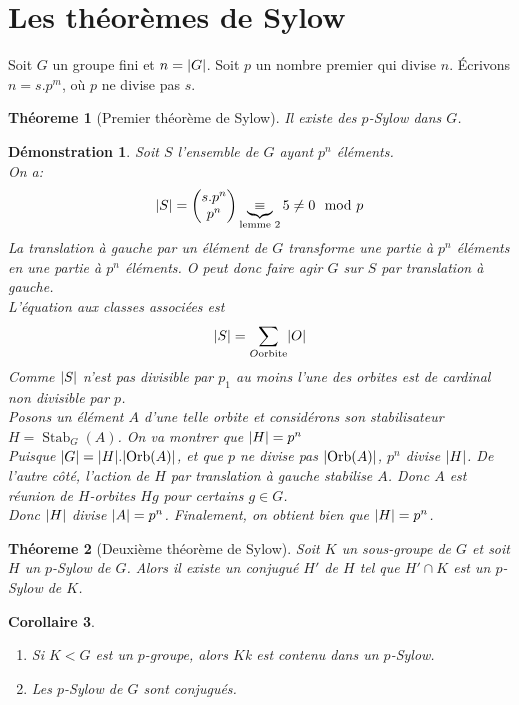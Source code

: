 \documentclass[a4paper, oneside]{report}
\theoremstyle{break}
\newtheorem{thm}{Théoreme}[section] %
\newtheorem{corollaire}[thm]{Corollaire}
\newtheorem*{demonstration}{Démonstration}
\DeclarePairedDelimiter\abs{\lvert}{\rvert}%
\DeclareMathOperator{\Stab}{Stab}
\DeclareMathOperator{\Orb}{Orb}
\newcommand{\ub}{\underbrace}
\begin{document}
\section{Les théorèmes de Sylow}

Soit $G$ un groupe fini et $n = \abs{G}$. Soit $p$ un nombre premier qui divise $n$. Écrivons $n = s.p^m$, où $p$ ne divise pas $s$.

\begin{thm}[Premier théorème de Sylow]
Il existe des $p$-Sylow dans $G$.
\end{thm}

\begin{demonstration}
Soit $S$ l'ensemble de $G$ ayant $p^n$ éléments.\\
On a:
\[
\abs{S} = 
\begin{pmatrix}
s.p^n		\\	p^n
\end{pmatrix} 
\ub{\equiv}_{\text{lemme 2}} 5 \neq 0 \mod p
\]
La translation à gauche par un élément de $G$ transforme une partie à $p^n$ éléments en une partie à $p^n$ éléments. O peut donc faire agir $G$ sur $S$ par translation à gauche.\\
L'équation aux classes associées est
\[
\abs{S} = \sum_{O \text{orbite}} \abs{O}
\]
Comme $\abs{S}$ n'est pas divisible par $p_1$ au moins l'une des orbites est de cardinal non divisible par $p$.\\
Posons un élément $A$ d'une telle orbite et considérons son stabilisateur $H = \Stab_G(A)$. On va montrer que $\abs{H} = p^n$\\
Puisque $\abs{G} = \abs{H} . \abs{\Orb(A)}$, et que $p$ ne divise pas $\abs{\Orb(A)}$, $p^n$ divise $\abs{H}$. De l'autre côté, l'action de $H$ par translation à gauche stabilise $A$. Donc $A$ est réunion de $H$-orbites $Hg$ pour certains $g \in G$.\\
Donc $\abs{H}$ divise $\abs{A} = p^n$. Finalement, on obtient bien que $\abs{H} = p^n$.
\end{demonstration}

\begin{thm}[Deuxième théorème de Sylow]
Soit $K$ un sous-groupe de $G$ et soit $H$ un $p$-Sylow de $G$. Alors il existe un conjugué $H'$ de $H$ tel que $H' \cap K$ est un $p$-Sylow de $K$.
\end{thm}

\begin{corollaire}
\begin{enumerate}
\item  Si $K < G$ est un $p$-groupe, alors $K$k est contenu dans un $p$-Sylow.

\medbreak

\item  Les $p$-Sylow de $G$ sont conjugués.

\end{enumerate}
\end{corollaire}
\end{document}
